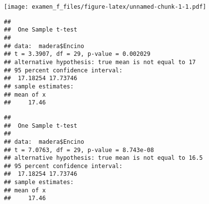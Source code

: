 \documentclass[
]{article}
\newenvironment{Shaded}{\begin{snugshade}}{\end{snugshade}}
\newcommand{\AttributeTok}[1]{\textcolor[rgb]{0.77,0.63,0.00}{#1}}
\newcommand{\CommentTok}[1]{\textcolor[rgb]{0.56,0.35,0.01}{\textit{#1}}}
\newcommand{\DecValTok}[1]{\textcolor[rgb]{0.00,0.00,0.81}{#1}}
\newcommand{\FloatTok}[1]{\textcolor[rgb]{0.00,0.00,0.81}{#1}}
\newcommand{\FunctionTok}[1]{\textcolor[rgb]{0.00,0.00,0.00}{#1}}
\newcommand{\NormalTok}[1]{#1}
\newcommand{\SpecialCharTok}[1]{\textcolor[rgb]{0.00,0.00,0.00}{#1}}
\begin{document}
\texttt{[image: examen\_f\_files/figure-latex/unnamed-chunk-1-1.pdf]}

\begin{Shaded}
\end{Shaded}

\begin{verbatim}
## 
##  One Sample t-test
## 
## data:  madera$Encino
## t = 3.3907, df = 29, p-value = 0.002029
## alternative hypothesis: true mean is not equal to 17
## 95 percent confidence interval:
##  17.18254 17.73746
## sample estimates:
## mean of x 
##     17.46
\end{verbatim}

\begin{Shaded}
\end{Shaded}

\begin{verbatim}
## 
##  One Sample t-test
## 
## data:  madera$Encino
## t = 7.0763, df = 29, p-value = 8.743e-08
## alternative hypothesis: true mean is not equal to 16.5
## 95 percent confidence interval:
##  17.18254 17.73746
## sample estimates:
## mean of x 
##     17.46
\end{verbatim}
\end{document}
